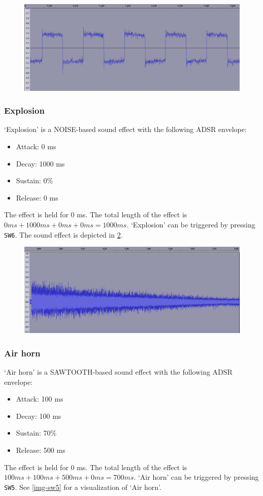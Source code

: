 \begin{figure}[H]
	\includegraphics[width = \textwidth]{images/SW4zoom.png}
	\caption{}
	\label{img-sw4zoom}
\end{figure}

\subsubsection{Explosion}

`Explosion' is a NOISE-based sound effect with the following ADSR envelope:
\begin{itemize}
	\item{Attack: 0 ms}
	\item{Decay: 1000 ms}
	\item{Sustain: 0\%}
	\item{Release: 0 ms}
\end{itemize}
The effect is held for 0 ms.
The total length of the effect is $0 ms + 1000 ms + 0 ms + 0 ms = 1000 ms$.
`Explosion' can be triggered by pressing \texttt{SW6}.
The sound effect is depicted in \ref{img-sw6}.

\begin{figure}[H]
	\includegraphics[width = \textwidth]{images/SW6.png}
	\caption{}
	\label{img-sw6}
\end{figure}


\subsubsection{Air horn}
`Air horn' is a SAWTOOTH-based sound effect with the following ADSR envelope:
\begin{itemize}
	\item{Attack: 100 ms}
	\item{Decay: 100 ms}
	\item{Sustain: 70\%}
	\item{Release: 500 ms}
\end{itemize}
The effect is held for 0 ms.
The total length of the effect is $100 ms + 100 ms + 500 ms + 0 ms = 700 ms$.
`Air horn' can be triggered by pressing \texttt{SW5}.
See \ref{img-sw5} for a visualization of `Air horn'.

